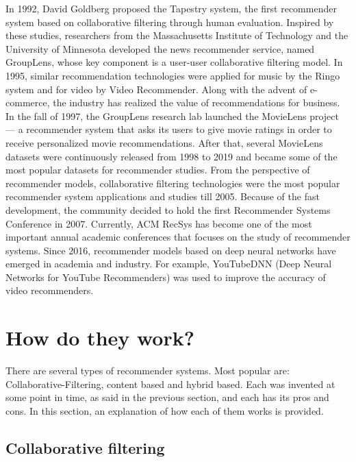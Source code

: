 \documentclass[12pt]{article}
\begin{document}
In 1992, David Goldberg proposed the Tapestry system, the first recommender system based on collaborative filtering through human evaluation. Inspired by these studies, researchers from the Massachusetts Institute of Technology and the University of Minnesota developed the news recommender service, named GroupLens, whose key component is a user-user collaborative filtering model. In 1995, similar recommendation technologies were applied for music by the Ringo system and for video by Video Recommender. Along with the advent of e-commerce, the industry has realized the value of recommendations for business. In the fall of 1997, the GroupLens research lab launched the MovieLens project — a recommender system that asks its users to give movie ratings in order to receive personalized movie recommendations. After that, several MovieLens datasets were continuously released from 1998 to 2019 and became some of the most popular datasets for recommender studies. From the perspective of recommender models, collaborative filtering technologies were the most popular recommender system applications and studies till 2005. Because of the fast development, the community decided to hold the first Recommender Systems Conference in 2007. Currently, ACM RecSys has become one of the most important annual academic conferences that focuses on the study of recommender systems. Since 2016, recommender models based on deep neural networks have emerged in academia and industry. For example, YouTubeDNN (Deep Neural Networks for YouTube Recommenders) was used to improve the accuracy of video recommenders.
\cite{1.3}

\section{How do they work?}
\sloppy
There are several types of recommender systems. Most popular are: Collaborative-Filtering, content based and hybrid based. Each was invented at some point in time, as said in the previous section, and each has its pros and cons. In this section, an explanation of how each of them works is provided.

\subsection{Collaborative filtering}
\end{document}
